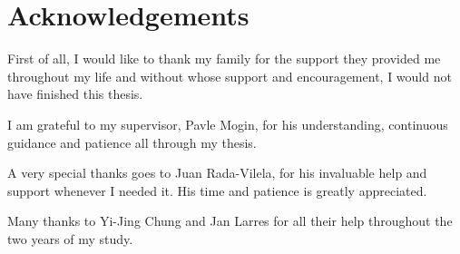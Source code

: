 \chapter*{Acknowledgements}

First of all, I would  like to thank my family for the support they provided
me throughout my life and without whose support and encouragement, I would
not have finished this thesis.

I am grateful to my supervisor, Pavle Mogin, for his understanding,
continuous guidance and patience all through my thesis. 

A very special thanks goes to Juan Rada-Vilela, for his invaluable  help and
support whenever I needed it. His time and patience is greatly appreciated.

Many thanks to Yi-Jing Chung  and Jan Larres for all their help throughout the
two years of my study.

\vfill